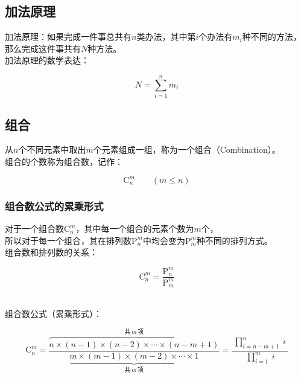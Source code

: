\documentclass[UTF8]{ctexart}
\begin{document}
\newpage

\subsection{加法原理}
    加法原理：如果完成一件事总共有$n$类办法，其中第$i$个办法有$m_i$种不同的方法，\\
    那么完成这件事共有$N$种方法。\\[3mm]
    加法原理的数学表达：
    \begin{large}
        \begin{equation*}
            N=\sum_{i=1}^{n}m_i
        \end{equation*}
    \end{large}

\subsection{组合}
    从$n$个不同元素中取出$m$个元素组成一组，称为一个组合（Combination）。\\[3mm]
    组合的个数称为组合数，记作：
    \begin{large}
        \begin{equation*}
            \mathrm{C}_n^m\qquad(m\leq n)
        \end{equation*}
    \end{large}

\subsubsection{组合数公式的累乘形式}
    对于一个组合数$\mathrm{C}_n^m$，其中每一个组合的元素个数为$m$个，\\[2mm]
    所以对于每一个组合，其在排列数$\mathrm{P}_n^m$中均会变为$\mathrm{P}_m^m$种不同的排列方式。\\[4mm]
    组合数和排列数的关系：
    \begin{large}
        \begin{equation*}
            \mathrm{C}_n^m=\frac{\mathrm{P}_n^m}{\mathrm{P}_m^m}
        \end{equation*}        
    \end{large}\\
    组合数公式（累乘形式）：
    \begin{large}
        \begin{equation*}
            \mathrm{C}_n^m=\frac{\overbrace{n\times(n-1)\times(n-2)\times\cdots\times(n-m+1)}^{\text{共}\,m\,\text{项}}}{\underbrace{m\times(m-1)\times(m-2)\times\cdots\times 1}_{\text{共}\,m\,\text{项}}}=\frac{~\prod_{i=n-m+1}^{n}~i~}{\,\prod_{i=1}^{m}~i}
        \end{equation*}
    \end{large}
    
\end{document}
